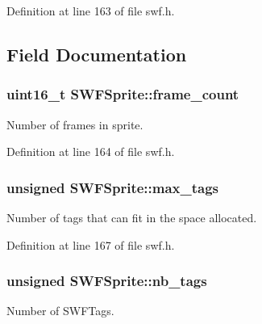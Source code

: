 Definition at line 163 of file swf.\+h.



\subsection{Field Documentation}
\hypertarget{struct_s_w_f_sprite_a952578e82c9d1dad81bbb086cb8ec1c2}{}
\subsubsection[{frame\+\_\+count}]{\setlength{\rightskip}{0pt plus 5cm}uint16\+\_\+t S\+W\+F\+Sprite\+::frame\+\_\+count}\label{struct_s_w_f_sprite_a952578e82c9d1dad81bbb086cb8ec1c2}


Number of frames in sprite. 



Definition at line 164 of file swf.\+h.

\hypertarget{struct_s_w_f_sprite_a508a2dc2cceb78be54bf2c40a1665236}{}
\subsubsection[{max\+\_\+tags}]{\setlength{\rightskip}{0pt plus 5cm}unsigned S\+W\+F\+Sprite\+::max\+\_\+tags}\label{struct_s_w_f_sprite_a508a2dc2cceb78be54bf2c40a1665236}


Number of tags that can fit in the space allocated. 



Definition at line 167 of file swf.\+h.

\hypertarget{struct_s_w_f_sprite_a9eae389efaf36d5ebf4e1e31edf2f05e}{}
\subsubsection[{nb\+\_\+tags}]{\setlength{\rightskip}{0pt plus 5cm}unsigned S\+W\+F\+Sprite\+::nb\+\_\+tags}\label{struct_s_w_f_sprite_a9eae389efaf36d5ebf4e1e31edf2f05e}


Number of S\+W\+F\+Tags. 



